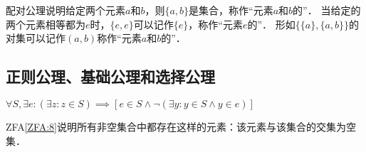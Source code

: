 配对公理说明给定两个元素$a$和$b$，则$ \{ a, b \} $是集合，称作``元素$a$和$b$的''．
当给定的两个元素相等都为$e$时，$ \{ e, e \} $可以记作$ \{ e \} $，称作``元素$e$的''．
形如$ \{ \{ a \}, \{ a, b \} \} $的对集可以记作$ (a, b) $称作``元素$a$和$b$的''．

\begin{ZermeloFraenkelAxioms}[并集公理]\label{ZFA:4}
\end{ZermeloFraenkelAxioms}

\begin{ZermeloFraenkelAxioms}[幂集公理]\label{ZFA:5}
\end{ZermeloFraenkelAxioms}

\begin{ZermeloFraenkelAxioms}[无穷公理]\label{ZFA:6}
\end{ZermeloFraenkelAxioms}

\begin{ZermeloFraenkelAxioms}[替换公理]\label{ZFA:7}
\end{ZermeloFraenkelAxioms}

\subsection{正则公理、基础公理和选择公理}

\begin{ZermeloFraenkelAxioms}[正则公理]\label{ZFA:8}
    $ \forall S, \exists e: (\exists z: z \in S) \implies [e \in S \land \lnot(\exists y: y \in S \land y \in e)] $
\end{ZermeloFraenkelAxioms}
ZFA\ref{ZFA:8}说明所有非空集合中都存在这样的元素：该元素与该集合的交集为空集．
